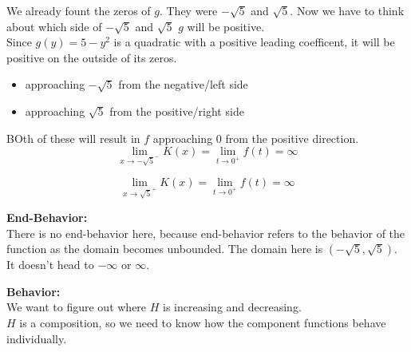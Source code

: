 \documentclass{ximera}
\begin{document}
We already fount the zeros of $g$.  They were $-\sqrt{5}$ and $\sqrt{5}$.  Now we have to think about which side of $-\sqrt{5}$ and $\sqrt{5}$ $g$ will be positive. \\


Since $g(y) = 5 - y^2$ is a quadratic with a positive leading coefficent, it will be positive on the outside of its zeros. 

\begin{itemize}
\item approaching $-\sqrt{5}$ from the negative/left side
\item approaching $\sqrt{5}$ from the positive/right side
\end{itemize}

BOth of these will result in $f$ approaching $0$ from the positive direction. \\



\[
\lim\limits_{x \to -\sqrt{5}^-} K(x)  = \lim\limits_{t \to 0^+} f(t) = \infty
\]



\[
\lim\limits_{x \to \sqrt{5}^+} K(x)  = \lim\limits_{t \to 0^+} f(t) = \infty
\]
















\textbf{\textcolor{blue!55!black}{End-Behavior:}} \\

There is no end-behavior here, because end-behavior refers to the behavior of the function as the domain becomes unbounded.  The domain here is $(-\sqrt{5}, \sqrt{5})$. It doesn't head to $-\infty$ or $\infty$.











\textbf{\textcolor{blue!55!black}{Behavior:}} \\


We want to figure out where $H$ is increasing and decreasing. \\

$H$ is a composition, so we need to know how the component functions behave individually. \\
\end{document}
